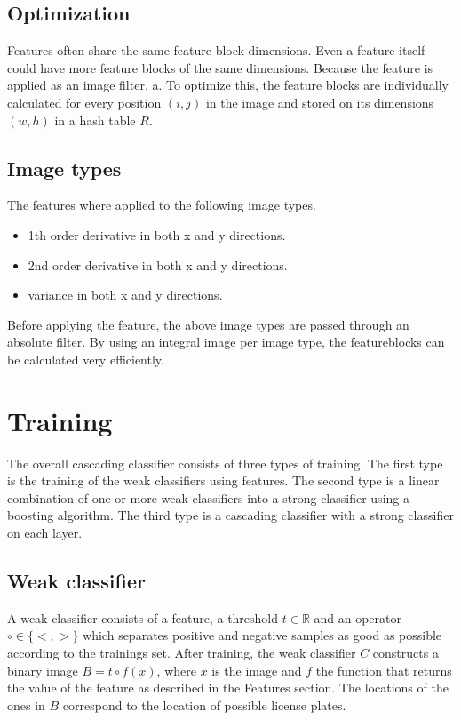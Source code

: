 \documentclass[a4paper,11pt]{article}
\begin{document}
\subsection*{Optimization}
Features often share the same feature block dimensions. Even a feature
itself could have more feature blocks of the same dimensions. Because the
feature is applied as an image filter, a.
To optimize this, the feature blocks are individually calculated for every
position $(i,j)$ in the image and stored on its dimensions $(w,h)$ in a hash
table $R$.

\subsection*{Image types}
The features where applied to the following image types.
\begin{itemize}
	\item{1th order derivative in both x and y directions.}
	\item{2nd order derivative in both x and y directions.}
	\item{variance in both x and y directions.}
\end{itemize}
Before applying the feature, the above image types are passed through an
absolute filter. By using an integral image \cite{viola} per image type, the
featureblocks can be calculated very efficiently.


\section*{Training}
The overall cascading classifier consists of three types of training. The first
type is the training of the weak classifiers using features. The second type is
a linear combination of one or more weak classifiers into a strong classifier
using a boosting algorithm. The third type is a cascading classifier
with a strong classifier on each layer.

\subsection*{Weak classifier}
A weak classifier consists of a feature, a threshold $t \in \mathbb{R}$ and an
operator $\circ \in \{<, >\}$ which separates positive and negative samples as
good as possible according to the trainings set. After training, the weak
classifier $C$ constructs a binary image $B = t \circ f(x)$, where $x$ is the
image and $f$ the function that returns the value of the feature as described
in the Features section. The locations of the ones in $B$ correspond to the
location of possible license plates.
\end{document}
